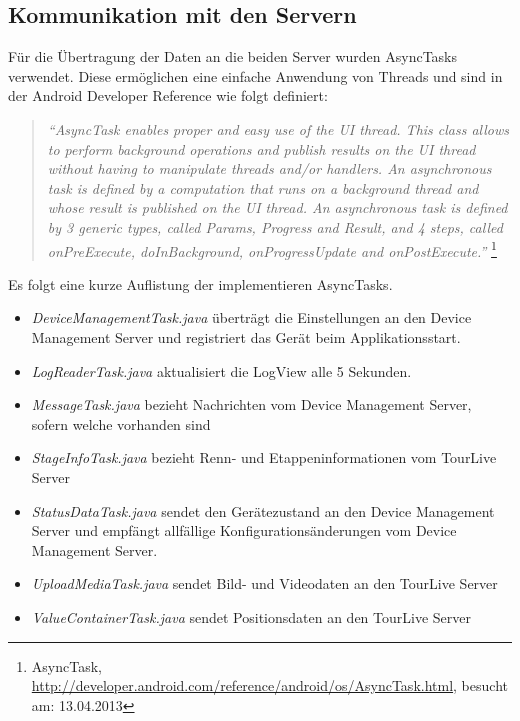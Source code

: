 \subsection{Kommunikation mit den Servern}
Für die Übertragung der Daten an die beiden Server wurden AsyncTasks verwendet. Diese ermöglichen eine einfache Anwendung von Threads und sind in der Android Developer Reference wie folgt definiert: 

\begin{quotation}
\textit{``AsyncTask enables proper and easy use of the UI thread. This class allows to perform background operations and publish results on the UI thread without having to manipulate threads and/or handlers. An asynchronous task is defined by a computation that runs on a background thread and whose result is published on the UI thread. An asynchronous task is defined by 3 generic types, called Params, Progress and Result, and 4 steps, called onPreExecute, doInBackground, onProgressUpdate and onPostExecute.''} \footnote{AsyncTask, \url{http://developer.android.com/reference/android/os/AsyncTask.html}, besucht am: 13.04.2013}
\end{quotation}

Es folgt eine kurze Auflistung der implementieren AsyncTasks.
\begin{itemize} [noitemsep,topsep=0pt]
	\item \textit{DeviceManagementTask.java} überträgt die Einstellungen an den Device Management Server und registriert das Gerät beim Applikationsstart.
	\item \textit{LogReaderTask.java} aktualisiert die LogView alle 5 Sekunden.
	\item \textit{MessageTask.java} bezieht Nachrichten vom Device Management Server, sofern welche vorhanden sind
	\item \textit{StageInfoTask.java} bezieht Renn- und Etappeninformationen vom TourLive Server
	\item \textit{StatusDataTask.java} sendet den Gerätezustand an den Device Management Server und empfängt allfällige Konfigurationsänderungen vom Device Management Server. 
	\item \textit{UploadMediaTask.java} sendet Bild- und Videodaten an den TourLive Server
	\item \textit{ValueContainerTask.java} sendet Positionsdaten an den TourLive Server
\end{itemize}

